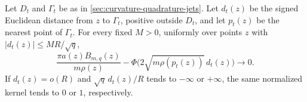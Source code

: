 \begin{theorem}\label{thm:curvature-boundary-jets}
Let $D_t$ and $\Gamma_t$ be as in \cref{sec:curvature-quadrature-jets}. Let $d_t(z)$ be the signed Euclidean distance from $z$ to $\Gamma_t$, positive outside $D_t$, and let $p_t(z)$ be the nearest point of $\Gamma_t$. For every fixed $M>0$, uniformly over points $z$ with $|d_t(z)|\leq MR/\sqrt q$,
\begin{equation}\label{eq:curvature-boundary-transition}
 \frac{\pi a(z)B_{m,q}(z)}{m\rho(z)}
 -\Phi\bigl(2\sqrt{m\rho(p_t(z))}\,d_t(z)\bigr)\longrightarrow0.
\end{equation}
If $d_t(z)=o(R)$ and $\sqrt q\,d_t(z)/R$ tends to $-\infty$ or
$+\infty$, the same normalized kernel tends to $0$ or $1$, respectively.
\end{theorem}
